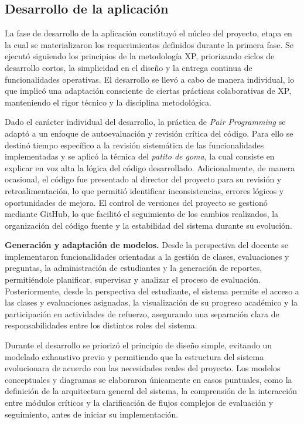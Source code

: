 \subsection{Desarrollo de la aplicación}

La fase de desarrollo de la aplicación constituyó el núcleo del proyecto, etapa en la cual se materializaron los requerimientos definidos durante la primera fase. Se ejecutó siguiendo los principios de la metodología XP, priorizando ciclos de desarrollo cortos, la simplicidad en el diseño y la entrega continua de funcionalidades operativas. El desarrollo se llevó a cabo de manera individual, lo que implicó una adaptación consciente de ciertas prácticas colaborativas de XP, manteniendo el rigor técnico y la disciplina metodológica.

Dado el carácter individual del desarrollo, la práctica de \textit{Pair Programming} se adaptó a un enfoque de autoevaluación y revisión crítica del código. Para ello se destinó tiempo específico a la revisión sistemática de las funcionalidades implementadas y se aplicó la técnica del \textit{patito de goma}, la cual consiste en explicar en voz alta la lógica del código desarrollado. Adicionalmente, de manera ocasional, el código fue presentado al director del proyecto para su revisión y retroalimentación, lo que permitió identificar inconsistencias, errores lógicos y oportunidades de mejora. El control de versiones del proyecto se gestionó mediante GitHub, lo que facilitó el seguimiento de los cambios realizados, la organización del código fuente y la estabilidad del sistema durante su evolución.

\textbf{Generación y adaptación de modelos.} Desde la perspectiva del docente se implementaron funcionalidades orientadas a la gestión de clases, evaluaciones y preguntas, la administración de estudiantes y la generación de reportes, permitiéndole planificar, supervisar y analizar el proceso de evaluación. Posteriormente, desde la perspectiva del estudiante, el sistema permite el acceso a las clases y evaluaciones asignadas, la visualización de su progreso académico y la participación en actividades de refuerzo, asegurando una separación clara de responsabilidades entre los distintos roles del sistema.

Durante el desarrollo se priorizó el principio de diseño simple, evitando un modelado exhaustivo previo y permitiendo que la estructura del sistema evolucionara de acuerdo con las necesidades reales del proyecto. Los modelos conceptuales y diagramas se elaboraron únicamente en casos puntuales, como la definición de la arquitectura general del sistema, la comprensión de la interacción entre módulos críticos y la clarificación de flujos complejos de evaluación y seguimiento, antes de iniciar su implementación.


